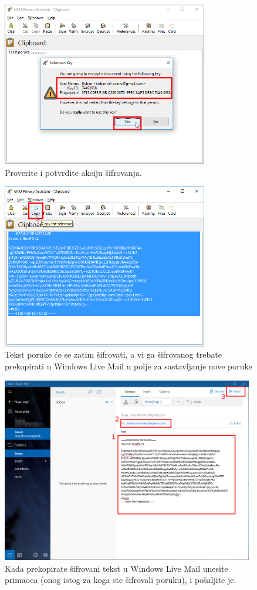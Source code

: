 \documentclass[a4paper,11pt]{article}
\begin{document}
\begin{figure}[!h]
	\begin{center}
		\includegraphics[width=9cm]{wlm_GPA_clipboard4.png}
		\caption{Proverite i potvrdite akciju \v{s}ifrovanja.}
		\label{gpa_WLM4}
	\end{center}
\end{figure}
\newpage
\begin{figure}[!h]
	\begin{center}
		\includegraphics[width=9cm]{wlm_GPA_clipboard5_copy_message.png}
		\caption{Tekst poruke \'{c}e se zatim \v{s}ifrovati, a vi ga \v{s}ifrovanog trebate prekopirati u Windows Live Mail u polje za sastavljanje nove poruke}
		\label{gpa_WLM5}
	\end{center}
\end{figure}

\begin{figure}[!h]
	\begin{center}
		\includegraphics[width=11cm]{EncryptedMailWLM.png}
		\caption{Kada prekopirate \v{s}ifrovani tekst u Windows Live Mail unesite primaoca (onog istog za koga ste \v{s}ifrovali poruku), i po\v{s}aljite je.}
		\label{gpa_WLM6}
	\end{center}
\end{figure}
\end{document}
